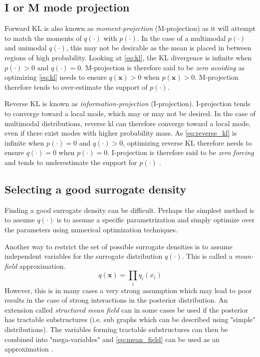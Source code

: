 \subsection{I or M mode projection}\label{sec:im-mode}

Forward KL is also known as \textit{moment-projection} (M-projection)  as it will attempt to match the moments of $q(\cdot)$ with $p(\cdot)$. In the case of a multimodal $p(\cdot)$ and unimodal $q(\cdot)$, this may not be desirable as the mean is placed in between regions of high probability. Looking at \cref{eq:kl}, the KL divergence is infinite when $p(\cdot) > 0$ and $q(\cdot) = 0$. M-projection is therefore said to be \textit{zero avoiding} as optimizing \cref{eq:kl} needs to ensure $q(\mathbf{x}) > 0$ when $p(\mathbf{x}) > 0$. M-projection therefore tends to over-estimate the support of $p(\cdot)$.

Reverse KL is known as \textit{information-projection} (I-projection). I-projection tends to converge toward a local mode, which may or may not be desired. In the case of multimodal distributions, reverse \acrshort{kl} can therefore converge toward a local mode, even if there exist modes with higher probability mass. As \cref{eq:reverse_kl} is infinite when $p(\cdot) = 0$ and $q(\cdot) > 0$, optimizing reverse KL therefore needs to ensure $q(\cdot) = 0$ when $p(\cdot)=0$. I-projection is therefore said to be \textit{zero forcing} and tends to underestimate the support for $p(\cdot)$ \cite{murphy}. 

\subsection{Selecting a good surrogate density}
Finding a good surrogate density can be difficult. Perhaps the simplest method is to assume $q(\cdot)$ is to assume a specific parametrization and simply optimize over the parameters using numerical optimization techniques. 

Another way to restrict the set of possible surrogate densities is to assume independent variables for the surrogate distribution $q(\cdot)$. This is called a \textit{mean-field} approximation.
\begin{equation}\label{eq:mean_field}
    q(\mathbf{x}) = \prod_i q_i(x_i)
\end{equation}
However, this is in many cases a very strong assumption which may lead to poor results in the case of strong interactions in the posterior distribution. An extension called \textit{structured mean field} can in some cases be used if the posterior has tractable substructures (i.e. sub graphs which can be described using "simple" distributions). The variables forming tractable substructures can then be combined into "mega-variables" and \cref{eq:mean_field} can be used as an approximation \cite{murphy}.

